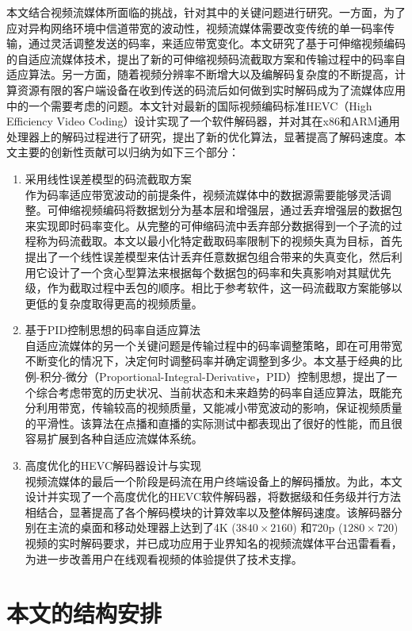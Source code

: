 本文结合视频流媒体所面临的挑战，针对其中的关键问题进行研究。一方面，为了应对异构网络环境中信道带宽的波动性，视频流媒体需要改变传统的单一码率传输，通过灵活调整发送的码率，来适应带宽变化。本文研究了基于可伸缩视频编码的自适应流媒体技术，提出了新的可伸缩视频码流截取方案和传输过程中的码率自适应算法。另一方面，随着视频分辨率不断增大以及编解码复杂度的不断提高，计算资源有限的客户端设备在收到传送的码流后如何做到实时解码成为了流媒体应用中的一个需要考虑的问题。本文针对最新的国际视频编码标准HEVC（High Efficiency Video Coding）\supercite{HEVC-Overview}设计实现了一个软件解码器，并对其在x86和ARM通用处理器上的解码过程进行了研究，提出了新的优化算法，显著提高了解码速度。本文主要的创新性贡献可以归纳为如下三个部分：
\begin{enumerate}
\item {采用线性误差模型的码流截取方案}\\
作为码率适应带宽波动的前提条件，视频流媒体中的数据源需要能够灵活调整。可伸缩视频编码将数据划分为基本层和增强层，通过丢弃增强层的数据包来实现即时码率变化。从完整的可伸缩码流中丢弃部分数据得到一个子流的过程称为码流截取。本文以最小化特定截取码率限制下的视频失真为目标，首先提出了一个线性误差模型来估计丢弃任意数据包组合带来的失真变化，然后利用它设计了一个贪心型算法来根据每个数据包的码率和失真影响对其赋优先级，作为截取过程中丢包的顺序。相比于参考软件，这一码流截取方案能够以更低的复杂度取得更高的视频质量。
\item {基于PID控制思想的码率自适应算法}\\
自适应流媒体的另一个关键问题是传输过程中的码率调整策略，即在可用带宽不断变化的情况下，决定何时调整码率并确定调整到多少。本文基于经典的比例-积分-微分（Proportional-Integral-Derivative，PID）控制思想，提出了一个综合考虑带宽的历史状况、当前状态和未来趋势的码率自适应算法，既能充分利用带宽，传输较高的视频质量，又能减小带宽波动的影响，保证视频质量的平滑性。该算法在点播和直播的实际测试中都表现出了很好的性能，而且很容易扩展到各种自适应流媒体系统。
\item {高度优化的HEVC解码器设计与实现}\\
视频流媒体的最后一个阶段是码流在用户终端设备上的解码播放。为此，本文设计并实现了一个高度优化的HEVC软件解码器，将数据级和任务级并行方法相结合，显著提高了各个解码模块的计算效率以及整体解码速度。该解码器分别在主流的桌面和移动处理器上达到了4K ($3840 \times 2160$) 和720p ($1280 \times 720$) 视频的实时解码要求，并已成功应用于业界知名的视频流媒体平台迅雷看看，为进一步改善用户在线观看视频的体验提供了技术支撑。
\end{enumerate}

\section{本文的结构安排}

